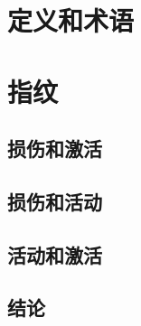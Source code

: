 \section{定义和术语}


\section{指纹}

\subsection{损伤和激活}

\subsection{损伤和活动}

\subsection{活动和激活}




\subsection{结论}


